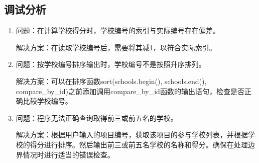 \documentclass[UTF8,titlepage]{ctexart}
\numberwithin{figure}{section}
\begin{document}
\subsection{调试分析}
\begin{enumerate}
    \item 问题：在计算学校得分时，学校编号的索引与实际编号存在偏差。
    
          解决方案：在读取学校编号后，需要将其减1，以符合实际索引。
    

          \item 问题：按学校编号排序输出时，学校编号不是按照升序排列。
    
          解决方案：可以在排序函数sort(schools.begin(), schools.end(), compare\_by\_id)之前添加调用compare\_by\_id函数的输出语句，检查是否正确比较学校编号。
    \item 问题：程序无法正确查询取得前三或前五名的学校。
    
          解决方案：根据用户输入的项目编号，获取该项目的参与学校列表，并根据学校的得分进行排序。然后输出前三或前五名学校的名称和得分。确保在处理边界情况时进行适当的错误检查。

\end{enumerate}
\end{document}
